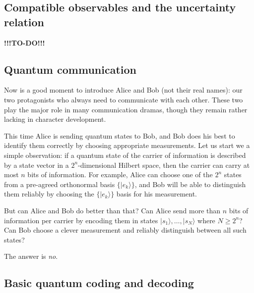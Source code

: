 \documentclass[fleqn]{article}
\begin{document}
\hypertarget{compatible-observables-and-the-uncertainty-relation}{%
\subsection{Compatible observables and the uncertainty relation}\label{compatible-observables-and-the-uncertainty-relation}}

\textbf{!!!TO-DO!!!}

\hypertarget{quantum-communication}{%
\subsection{Quantum communication}\label{quantum-communication}}

Now is a good moment to introduce Alice and Bob (not their real names): our two protagonists who always need to communicate with each other.
These two play the major role in many communication dramas, though they remain rather lacking in character development.

This time Alice is sending quantum states to Bob, and Bob does his best to identify them correctly by choosing appropriate measurements.
Let us start we a simple observation: if a quantum state of the carrier of information is described by a state vector in a \(2^n\)-dimensional Hilbert space, then the carrier can carry at most \(n\) bits of information.
For example, Alice can choose one of the \(2^n\) states from a pre-agreed orthonormal basis \(\{|e_k\rangle\}\), and Bob will be able to distinguish them reliably by choosing the \(\{|e_k\rangle\}\) basis for his measurement.

But can Alice and Bob do better than that?
Can Alice send more than \(n\) bits of information per carrier by encoding them in states \(|s_1\rangle,\ldots,|s_N\rangle\) where \(N \geqslant 2^n\)?
Can Bob choose a clever measurement and reliably distinguish between all such states?

The answer is \emph{no}.

\hypertarget{basic-quantum-coding-and-decoding}{%
\subsection{Basic quantum coding and decoding}\label{basic-quantum-coding-and-decoding}}
\end{document}
